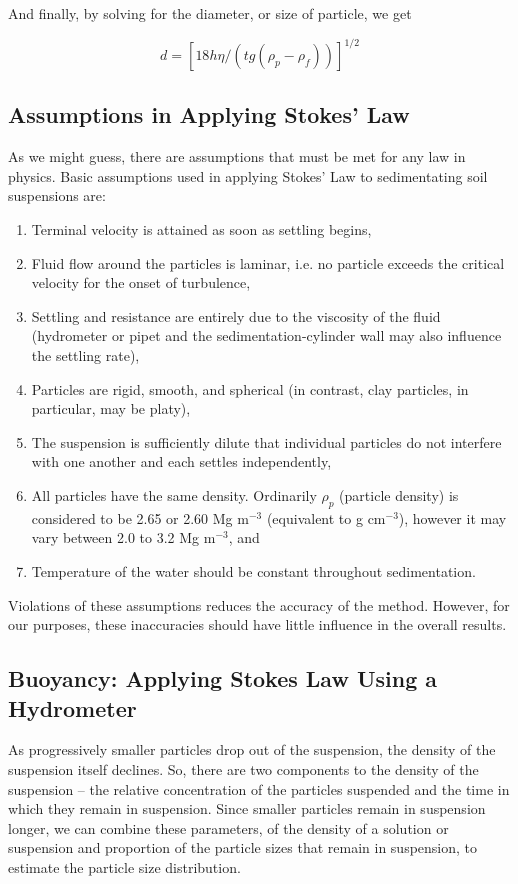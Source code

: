 \documentclass{tufte-handout}
\begin{document}
\noindent And finally, by solving for the diameter, or size of particle, we get

\begin{equation}
d = [18h\eta/(tg(\rho_p - \rho_f))]^{1/2}
\end{equation}

\subsection{Assumptions in Applying Stokes' Law}

As we might guess, there are assumptions that must be met for any law in physics. 
Basic assumptions used in applying Stokes' Law to sedimentating soil suspensions are:
 
\begin{enumerate}
	\item Terminal velocity is attained as soon as settling begins,
	\item Fluid flow around the particles is laminar, i.e. no particle exceeds the critical velocity for the onset of turbulence, 
	\item Settling and resistance are entirely due to the viscosity of the fluid (hydrometer or pipet and the sedimentation-cylinder wall may also influence the settling rate),
	\item Particles are rigid, smooth, and spherical (in contrast, clay particles, in particular, may be platy),
	\item The suspension is sufficiently dilute that individual particles do not interfere with one another and each settles independently,  
	\item All particles have the same density. Ordinarily $\rho_p$ (particle density) is considered to be 2.65 or 2.60 Mg m$^{-3}$ (equivalent to g cm$^{-3}$), however it may vary between 2.0 to 3.2 Mg m$^{-3}$, and
	\item Temperature of the water should be constant throughout sedimentation.
\end{enumerate}

Violations of these assumptions reduces the accuracy of the method. However, for our purposes, these inaccuracies should have little influence in the overall results.  

\subsection{Buoyancy: Applying Stokes Law Using a Hydrometer}

As progressively smaller particles drop out of the suspension, the density of the suspension itself declines. So, there are two components to the density of the suspension -- the relative concentration of the particles suspended and the time in which they remain in suspension. Since smaller particles remain in suspension longer, we can combine these parameters, of the density of a solution or suspension and proportion of the particle sizes that remain in suspension, to estimate the particle size distribution. 
\end{document}
